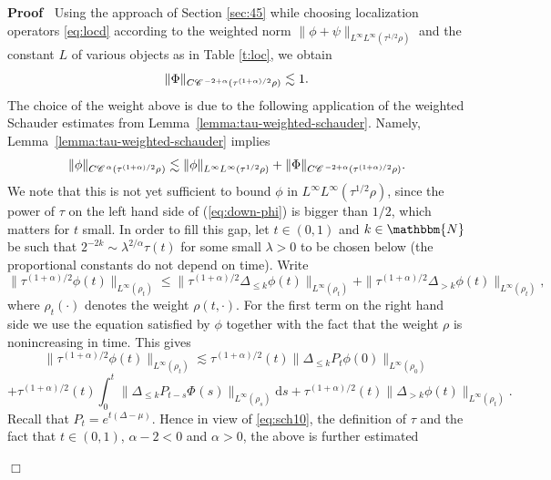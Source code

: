\documentclass[a4paper,11pt]{article}
\newcommand{\mathd}{\mathrm{d}}
\newenvironment{proof}{\noindent\textbf{Proof\ }}{\hspace*{\fill}$\Box$\medskip}
\numberwithin{equation}{section}
\newcommand{\CC}{\mathscr{C} \hspace{.1em}}
\newcommand{\8}{\infty}
\begin{document}
\begin{proof}
  Using the approach of Section \ref{sec:45} while choosing localization
  operators \eqref{eq:locd} according to the weighted norm $\| \phi + \psi \|_{L^{\infty}
  L^{\infty} (\tau^{1 / 2} \rho)}$ and the constant $L$ of various objects as in Table \ref{t:loc}, we obtain
     \begin{equation}\label{eq:Ph}
 \| \Phi \|_{C \CC^{- 2 + \alpha} (\tau^{(1 + \alpha) / 2} \rho)} \lesssim
     1.
     \end{equation}
The choice of the weight above is due to the following application of the weighted Schauder estimates from Lemma~\ref{lemma:tau-weighted-schauder}.   Namely, Lemma~\ref{lemma:tau-weighted-schauder} implies
  \begin{equation}
    \| \phi \|_{C \CC^{\alpha} (\tau^{(1 + \alpha) / 2} \rho^{})} \lesssim \|
    \phi \|_{L^{\infty} L^{\infty} (\tau^{1 / 2} \rho)} + \| \Phi \|_{C \CC^{-
    2 + \alpha} (\tau^{(1 + \alpha) / 2} \rho)} . \label{eq:down-phi}
  \end{equation}
  We note that this is not yet sufficient to bound $\phi$ in $L^{\infty}
  L^{\infty} (\tau^{1 / 2} \rho)$, since the power of $\tau$ on the left hand side of
  (\ref{eq:down-phi}) is bigger than $1 / 2$, which matters for $t$ small. In order to fill this gap, let $t\in (0,1)$ and
  $k \in \mathbbm{N}$ be such that $2^{- 2 k} \sim \lambda^{2 / \alpha} \tau (t)$
  for some small $\lambda > 0$ to be chosen below (the proportional constants do not depend on time). Write
  \[ \| \tau^{(1 + \alpha) / 2} \phi (t) \|_{L^{\infty} (\rho_t)} \leqslant \|
     \tau^{(1 + \alpha) / 2} \Delta_{\leqslant k} \phi (t) \|_{L^{\infty}
     (\rho_t)} + \| \tau^{(1 + \alpha) / 2} \Delta_{> k} \phi (t)
     \|_{L^{\infty} (\rho_t)}, \]
  where $\rho_t (\cdot)$ denotes the weight $\rho (t, \cdot)$. For the first
  term on the right hand side we use the equation satisfied by $\phi$ together
  with the fact that the weight $\rho$ is nonincreasing in time. This gives
  \[ \| \tau^{(1 + \alpha) / 2} \phi (t) \|_{L^{\infty} (\rho_t)} \lesssim
     \tau^{(1 + \alpha) / 2} (t) \| \Delta_{\leqslant k} P_t \phi (0)
     \|_{L^{\infty} (\rho_0)} \]
  \[ + \tau^{(1 + \alpha) / 2} (t) \int_0^t  \|
     \Delta_{\leqslant k} P_{t - s} \Phi_{} (s) \|_{L^{\infty} (\rho_s)}
     \mathd s + \tau^{(1 + \alpha) / 2} (t) \| \Delta_{> k} \phi (t)
     \|_{L^{\infty} (\rho_t)} . \]
Recall  that $P_{t}=e^{t(\Delta-\mu)}$. Hence in view of \eqref{eq:sch10}, the definition of $\tau$ and the fact that $t\in(0,1)$, $\alpha - 2 < 0$ and $\alpha > 0$,  the above is further estimated

\end{proof}
\end{document}
